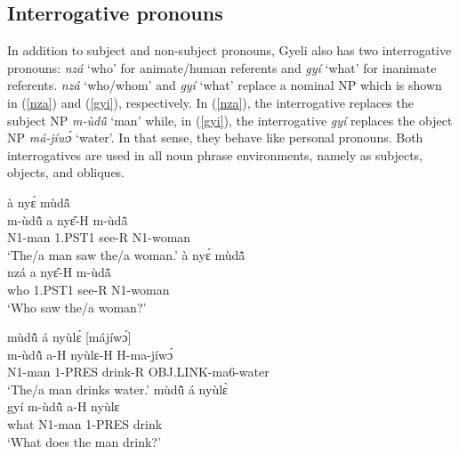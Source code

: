  




\subsection{Interrogative pronouns}
\label{sec:INTERRPRO}

In addition to subject and non-subject pronouns, Gyeli also has two interrogative pronouns: {\itshape nzá} `who' for animate/human referents and {\itshape gyí} `what' for inanimate referents.
{\itshape nzá} `who/whom' and {\itshape gyí} `what' replace a nominal NP which is shown in (\ref{nza}) and (\ref{gyi}), respectively. In (\ref{nza}), the interrogative replaces the subject NP {\itshape m-ùdũ̂} `man' while, in (\ref{gyi}), the interrogative {\itshape gyí} replaces the object NP {\itshape má-jíwɔ́} `water'. In that sense, they behave like personal pronouns. Both interrogatives are used in all noun phrase environments, namely as subjects, objects, and obliques. 

\begin{exe}
\ex\label{nza}
\begin{xlist}
\ex \label{nza1}
  \glll     [mùdũ̂] à nyɛ́ mùdã̂ \\
              m-ùdũ̂ a nyɛ̂-H m-ùdã̂\\
                N1-man 1.PST1 see-R N1-woman \\
    \trans `The/a man saw the/a woman.'
\ex\label{nza2}
   à nyɛ́ mùdã̂  \\
           nzá  a nyɛ̂-H m-ùdã̂ \\
          who 1.PST1 see-R N1-woman \\
    \trans `Who saw the/a woman?'
\end {xlist}
\end {exe}

\begin{exe}
\ex\label{gyi}
\begin{xlist}
\ex \label{gyi1}
  \glll     mùdũ̂ á nyùlɛ́ [májíwɔ́] \\
             m-ùdũ̂ a-H nyùlɛ-H H-ma-jíwɔ́ \\
              N1-man 1-PRES drink-R OBJ.LINK-ma6-water \\
    \trans `The/a man drinks water.'
\ex\label{gyi2}
  mùdũ̂ á nyùlɛ̀  \\
           gyí m-ùdũ̂ a-H nyùlɛ \\
             what N1-man 1-PRES drink \\
    \trans `What does the man drink?'
\end {xlist}
\end {exe}

